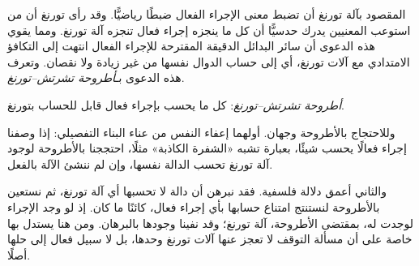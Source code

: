 \documentclass[../../../include/open-logic-section]{subfiles}
\begin{document}

المقصود بآلة تورنغ أن تضبط معنى الإجراء الفعال ضبطًا رياضيًّا. وقد رأى تورنغ أن من استوعب المعنيين يدرك حدسيًّا أن كل ما ينجزه إجراء فعال تنجزه آلة تورنغ. ومما يقوي هذه الدعوى أن سائر البدائل الدقيقة المقترحة للإجراء الفعال انتهت إلى التكافؤ الامتدادي مع آلات تورنغ، أي إلى حساب الدوال نفسها من غير زيادة ولا نقصان. وتعرف هذه الدعوى بـ\emph{أطروحة تشرتش--تورنغ}.

\begin{defn}
\emph{أطروحة تشرتش--تورنغ}: كل ما يحسب بإجراء فعال قابل للحساب بتورنغ.
\end{defn}

وللاحتجاج بالأطروحة وجهان. أولهما إعفاء النفس من عناء البناء التفصيلي: إذا وصفنا إجراء فعالًا يحسب شيئًا، بعبارة تشبه «الشفرة الكاذبة» مثلًا، احتججنا بالأطروحة لوجود آلة تورنغ تحسب الدالة نفسها، وإن لم ننشئ الآلة بالفعل.

والثاني أعمق دلالة فلسفية. فقد نبرهن أن دالة لا تحسبها أي آلة تورنغ، ثم نستعين بالأطروحة لنستنتج امتناع حسابها بأي إجراء فعال، كائنًا ما كان. إذ لو وجد الإجراء لوجدت له، بمقتضى الأطروحة، آلة تورنغ؛ وقد نفينا وجودها بالبرهان. ومن هنا يستدل بها خاصة على أن مسألة التوقف لا تعجز عنها آلات تورنغ وحدها، بل لا سبيل فعال إلى حلها أصلًا.
\end{document}
